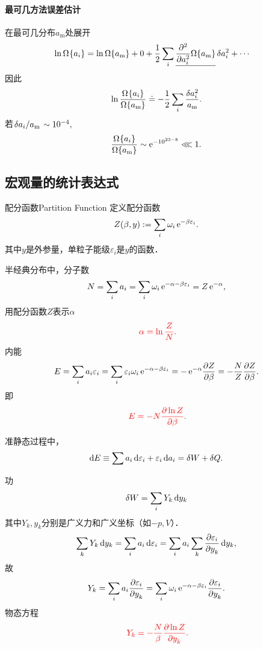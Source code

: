 \paragraph*{最可几方法误差估计}
在最可几分布$a_\mathrm m$处展开
\begin{align*}
	\ln\Omega_{\mathrm{\,\!}}\!\left\{a_i\right\} & =\ln\Omega\!\left\{a_\mathrm m\right\}+0+\frac12\sum_i\underline{\frac{\partial^{2}}{\partial a_i^{2}}\Omega\!\left\{a_\mathrm m\right\}}\,\delta a_i^2+\cdots
\end{align*}
因此
\[
	\ln\frac\Om\Omm\doteq-\frac12\sum_i\frac{\delta a_i^2}{a_\mathrm m}.
\]
若$\left.\delta a_i\middle\slash a_\mathrm m\right.\sim 10^{-4},$
\[
	\frac\Om\Omm\sim\e{-10^{23-8}}\lll 1.
\]
\subsection{宏观量的统计表达式}
\begin{definition}{配分函数}{Partition Function}
	定义配分函数
	\begin{align}
		Z(\beta,y):=\sum_i\omega_i\mathop{}\!\mathrm{e}^{-\beta\varepsilon_i}.
	\end{align}
	其中$y$是外参量，单粒子能级$\varepsilon_i$是$y$的函数．
\end{definition}
半经典分布中，分子数
\[
	N=\sum_ia_i=\sum_i\omega_i\mathop{}\!\mathrm{e}^{-\alpha-\beta\varepsilon_i}=Z\mathop{}\!\mathrm{e}^{-\alpha},
\]
用配分函数$Z$表示$\alpha$
\begin{align}
	\;\textcolor{red}{\alpha=\ln\frac ZN.}
\end{align}
内能
\[
	E=\sum_ia_i\varepsilon_i=\sum_i\varepsilon_i\omega_i\e{-\alpha-\beta\varepsilon_i}=-\e{-\alpha}\pv Z\beta=-\frac NZ\pv Z\beta.
\]
即
\begin{align}
	\;\textcolor{red}{E=-N\frac{\partial^{\;\!\!}\ln Z}{\partial \beta^{\;\!\!}}.}
\end{align}

准静态过程中，
\[
	\mathop{}\!\mathrm{d} E\equiv\sum a_i\mathop{}\!\mathrm{d}\varepsilon_i+\varepsilon_i\mathop{}\!\mathrm{d} a_i=\delta W+\delta Q.
\]

功
\[
	\delta W=\sum_iY_k\mathop{}\!\mathrm{d} y_k
\]
其中$Y_k,y_k$分别是广义力和广义坐标（如$-p,V$）．
\[
	\sum_kY_k\mathop{}\!\mathrm{d} y_k=\sum_ia_i\mathop{}\!\mathrm{d}\varepsilon_i=\sum_i a_i\sum_k\frac{\partial^{\;\!\!}\varepsilon_i}{\partial y_k^{\;\!\!}}\mathop{}\!\mathrm{d} y_k,
\]
故
\[
	Y_k=\sum_ia_i\pv{\varepsilon_i}{y_k}=\sum_i\omega_i\e{-\alpha-\beta\varepsilon_i}\pv{\varepsilon_i}{y_k}.
\]
物态方程
\begin{align}
	\;\textcolor{red}{Y_k=-\frac N\beta\frac{\partial^{\;\!\!}\ln Z}{\partial y_k^{\;\!\!}}.}
\end{align}

